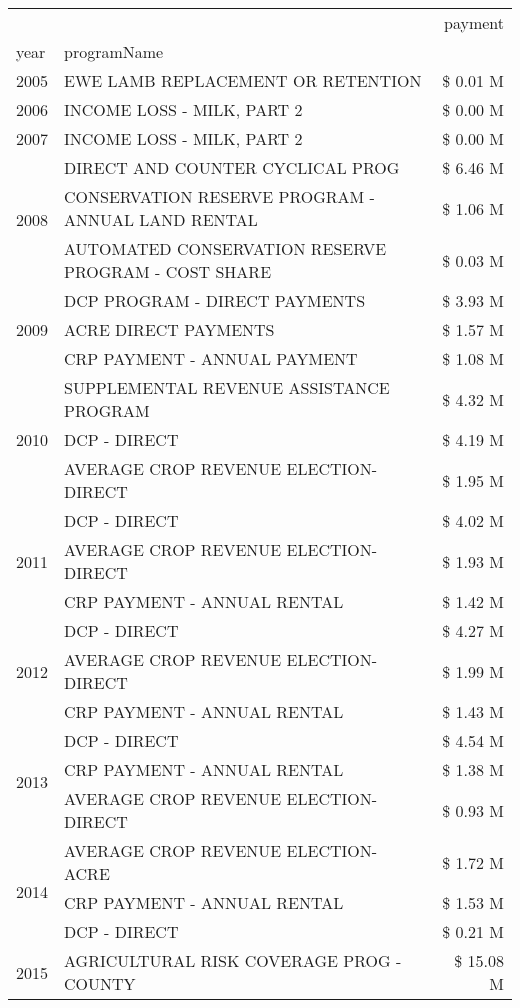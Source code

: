 \begin{tabular}{llr}
\toprule
 &  & payment \\
year & programName &  \\
\midrule
2005 & EWE LAMB REPLACEMENT OR RETENTION & \$ 0.01 M \\
\cline{1-3}
2006 & INCOME LOSS - MILK, PART 2 & \$ 0.00 M \\
\cline{1-3}
2007 & INCOME LOSS - MILK, PART 2 & \$ 0.00 M \\
\cline{1-3}
\multirow[t]{3}{*}{2008} & DIRECT AND COUNTER CYCLICAL PROG & \$ 6.46 M \\
 & CONSERVATION RESERVE PROGRAM - ANNUAL LAND RENTAL & \$ 1.06 M \\
 & AUTOMATED CONSERVATION RESERVE PROGRAM - COST SHARE & \$ 0.03 M \\
\cline{1-3}
\multirow[t]{3}{*}{2009} & DCP PROGRAM - DIRECT PAYMENTS & \$ 3.93 M \\
 & ACRE DIRECT PAYMENTS & \$ 1.57 M \\
 & CRP PAYMENT - ANNUAL PAYMENT & \$ 1.08 M \\
\cline{1-3}
\multirow[t]{3}{*}{2010} & SUPPLEMENTAL REVENUE ASSISTANCE PROGRAM & \$ 4.32 M \\
 & DCP - DIRECT & \$ 4.19 M \\
 & AVERAGE CROP REVENUE ELECTION-DIRECT & \$ 1.95 M \\
\cline{1-3}
\multirow[t]{3}{*}{2011} & DCP - DIRECT & \$ 4.02 M \\
 & AVERAGE CROP REVENUE ELECTION-DIRECT & \$ 1.93 M \\
 & CRP PAYMENT - ANNUAL RENTAL & \$ 1.42 M \\
\cline{1-3}
\multirow[t]{3}{*}{2012} & DCP - DIRECT & \$ 4.27 M \\
 & AVERAGE CROP REVENUE ELECTION-DIRECT & \$ 1.99 M \\
 & CRP PAYMENT - ANNUAL RENTAL & \$ 1.43 M \\
\cline{1-3}
\multirow[t]{3}{*}{2013} & DCP - DIRECT & \$ 4.54 M \\
 & CRP PAYMENT - ANNUAL RENTAL & \$ 1.38 M \\
 & AVERAGE CROP REVENUE ELECTION-DIRECT & \$ 0.93 M \\
\cline{1-3}
\multirow[t]{3}{*}{2014} & AVERAGE CROP REVENUE ELECTION-ACRE & \$ 1.72 M \\
 & CRP PAYMENT - ANNUAL RENTAL & \$ 1.53 M \\
 & DCP - DIRECT & \$ 0.21 M \\
\cline{1-3}
\multirow[t]{3}{*}{2015} & AGRICULTURAL RISK COVERAGE PROG - COUNTY & \$ 15.08 M \\

\end{tabular}
